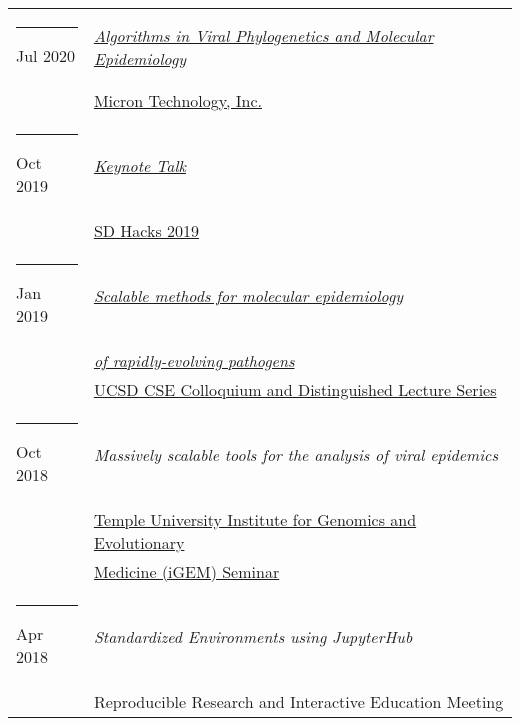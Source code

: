 \documentclass[margin,line]{res}
\begin{document}
\begin{resume}
\begin{longtable}{@{}p{0.7in}p{4in}}
\hspace*{-4mm} \rule{-1mm}{5mm} Jul 2020 & \href{https://www.micron.com/}{\textit{Algorithms in Viral Phylogenetics and Molecular Epidemiology}}\\*
\hspace*{-4mm} & \hspace{4mm} \href{https://www.micron.com/}{Micron Technology, Inc.}\\
\hspace*{-4mm} \rule{-1mm}{5mm} Oct 2019 & \href{https://www.sdhacks.io/}{\textit{Keynote Talk}}\\*
\hspace*{-4mm} & \hspace{4mm} \href{https://www.sdhacks.io/}{SD Hacks 2019}\\
\hspace*{-4mm} \rule{-1mm}{5mm} Jan 2019 & \href{https://cse.ucsd.edu/about/scalable-methods-molecular-epidemiology-rapidly-evolving-pathogens}{\textit{Scalable methods for molecular epidemiology}}\\*
\hspace*{-4mm} & \hspace{4mm} \href{https://cse.ucsd.edu/about/scalable-methods-molecular-epidemiology-rapidly-evolving-pathogens}{\textit{of rapidly-evolving pathogens}}\\*
\hspace*{-4mm} & \hspace{4mm} \href{https://cse.ucsd.edu/about/cse-colloquium-dls/2018-2019}{UCSD CSE Colloquium and Distinguished Lecture Series}\\
\hspace*{-4mm} \rule{-1mm}{5mm} Oct 2018 & \textit{Massively scalable tools for the analysis of viral epidemics}\\*
\hspace*{-4mm} & \hspace{4mm} \href{http://igem.temple.edu/home}{Temple University Institute for Genomics and Evolutionary}\\*
\hspace*{-4mm} & \hspace{4mm} \href{http://igem.temple.edu/home}{Medicine (iGEM) Seminar}\\
\hspace*{-4mm} \rule{-1mm}{5mm} Apr 2018 & \textit{Standardized Environments using JupyterHub}\\*
\hspace*{-4mm} & \hspace{4mm} Reproducible Research and Interactive Education Meeting\\*

\end{longtable}
\end{resume}
\end{document}
